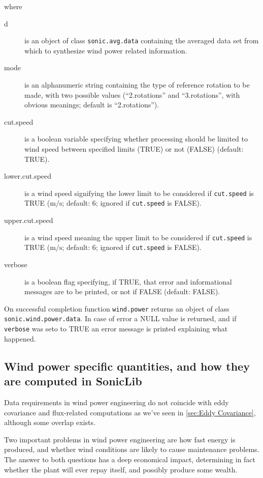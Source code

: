 \documentclass[a4paper,10pt]{book}
\begin{document}
\noindent where

\begin{description}
 \item[d] is an object of class \verb|sonic.avg.data| containing the averaged data set from which to synthesize wind power related information.
 \item[mode] is an alphanumeric string containing the type of reference rotation to be made, with two possible values (``2.rotations'' and ``3.rotations'', with obvious meanings; default is ``2.rotations'').
 \item[cut.speed] is a boolean variable specifying whether processing should be limited to wind speed between specified limits (TRUE) or not (FALSE) (default: TRUE).
 \item[lower.cut.speed] is a wind speed signifying the lower limit to be considered if \verb|cut.speed| is TRUE ($\mbox{m/s}$; default: 6; ignored if \verb|cut.speed| is FALSE).
 \item[upper.cut.speed] is a wind speed meaning the upper limit to be considered if \verb|cut.speed| is TRUE ($\mbox{m/s}$; default: 6; ignored if \verb|cut.speed| is FALSE).
 \item[verbose] is a boolean flag specifying, if TRUE, that error and informational messages are to be printed, or not if FALSE (default: FALSE).
\end{description}

On successful completion function \verb|wind.power| returns an object of class \verb|sonic.wind.power.data|. In case of error a NULL value is returned, and if \verb|verbose| was seto to TRUE an error message is printed explaining what happened.

\subsection{Wind power specific quantities, and how they are computed in SonicLib}

Data requirements in wind power engineering do not coincide with eddy covariance and flux-related computations as we've seen in \ref{sec:Eddy Covariance}, although some overlap exists.

Two important problems in wind power engineering are how fast energy is produced, and whether wind conditions are likely to cause maintenance problems. The answer to both questions has a deep economical impact, determining in fact whether the plant will ever repay itself, and possibly produce some wealth.
\end{document}
